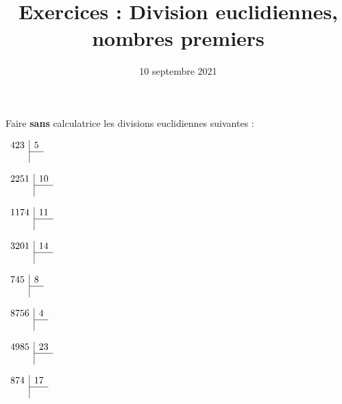 \documentclass[a4paper,12pt]{article}
\title{Exercices : Division euclidiennes, nombres premiers}
\date{10 septembre 2021}
\author{}
\begin{document}
\maketitle

\begin{exercice}
	Faire \textbf{sans} calculatrice les divisions euclidiennes suivantes :
	\begin{enumerate}
		\begin{minipage}{0.45\linewidth}
			\item $\begin{array}{r|r}
					423 & 5 \\
					\cline{2-2}
					    &
				\end{array}$
			\item $\begin{array}{r|r}
					2251 & 10 \\
					\cline{2-2}
					     &
				\end{array}$
			\item $\begin{array}{r|r}
					1174 & 11 \\
					\cline{2-2}
					     &
				\end{array}$
			\item $\begin{array}{r|r}
					3201 & 14 \\
					\cline{2-2}
					     &
				\end{array}$
		\end{minipage}
		\begin{minipage}{0.45\linewidth}
			\item $\begin{array}{r|r}
					745 & 8 \\
					\cline{2-2}
					    &
				\end{array}$
			\item $\begin{array}{r|r}
					8756 & 4 \\
					\cline{2-2}
					     &
				\end{array}$
			\item $\begin{array}{r|r}
					4985 & 23 \\
					\cline{2-2}
					     &
				\end{array}$
			\item $\begin{array}{r|r}
					874 & 17 \\
					\cline{2-2}
					    &
				\end{array}$
		\end{minipage}
	\end{enumerate}
\end{exercice}
\end{document}
